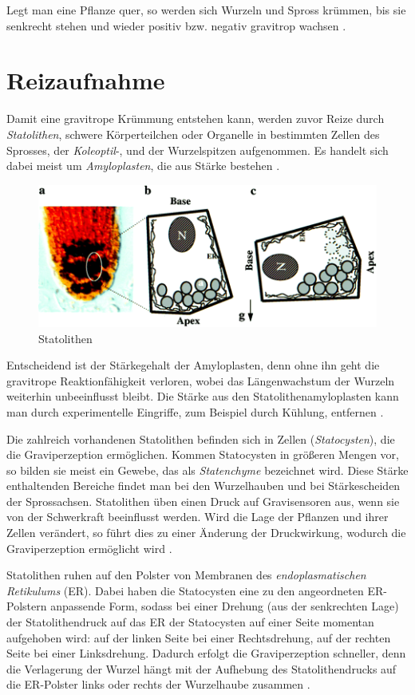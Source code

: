 \documentclass[
a4paper, 
11pt, 
ngerman,
listof=totoc,
bibliography=totocnumbered,
abstracton
]{scrreprt}
\begin{document}
Legt man eine Pflanze quer, so werden sich Wurzeln und Spross krümmen, bis sie senkrecht stehen und wieder positiv bzw. negativ gravitrop wachsen
\parencite[528]{Luettge}.






\section{Reizaufnahme}

Damit eine gravitrope Krümmung entstehen kann, werden zuvor Reize durch \emph{Statolithen}, schwere Körperteilchen oder Organelle in bestimmten Zellen des Sprosses, der \emph{Koleoptil}-, und der Wurzelspitzen aufgenommen. Es handelt sich dabei meist um \emph{Amyloplasten}, die aus Stärke bestehen \parencite[530]{Luettge}.

\begin{figure}[H]
	\centering 
	\includegraphics[width = 0.4\linewidth]{bilder/Statolithen2.png}
	\caption{Statolithen \label{Statolithen}}
\end{figure} 

Entscheidend ist der Stärkegehalt  der Amyloplasten, denn ohne ihn geht die gravitrope Reaktionfähigkeit verloren, wobei das Längenwachstum der Wurzeln weiterhin unbeeinflusst bleibt.
Die Stärke aus den Statolithenamyloplasten kann man durch experimentelle Eingriffe, zum Beispiel durch Kühlung, entfernen \parencite[452]{Strasburger}.

Die zahlreich vorhandenen Statolithen befinden sich in Zellen (\emph{Statocysten}), die die Graviperzeption ermöglichen. Kommen Statocysten in größeren Mengen vor, so bilden sie meist ein Gewebe, das als \emph{Statenchyme} bezeichnet wird.
Diese Stärke enthaltenden Bereiche findet man bei den Wurzelhauben und bei Stärkescheiden der Sprossachsen.  
Statolithen üben einen Druck auf Gravisensoren aus, wenn sie von der Schwerkraft beeinflusst werden. Wird die Lage der Pflanzen und ihrer Zellen verändert, so führt dies zu einer Änderung der Druckwirkung, wodurch die Graviperzeption ermöglicht wird \parencite[501f]{Nultsch}.

Statolithen ruhen auf den {\glqq Polster\grqq} von Membranen des \emph{endoplasmatischen Retikulums} (ER). Dabei haben die Statocysten eine zu den angeordneten ER-Polstern anpassende Form, sodass bei einer Drehung (aus der senkrechten Lage) der Statolithendruck auf das ER der Statocysten auf einer Seite momentan aufgehoben wird: auf der linken Seite bei einer Rechtsdrehung, auf der rechten Seite bei einer Linksdrehung.
Dadurch erfolgt die Graviperzeption schneller, denn die Verlagerung der Wurzel hängt  mit der Aufhebung des Statolithendrucks auf die ER-Polster links oder rechts der Wurzelhaube zusammen \parencite[531f]{Luettge}.
\end{document}
